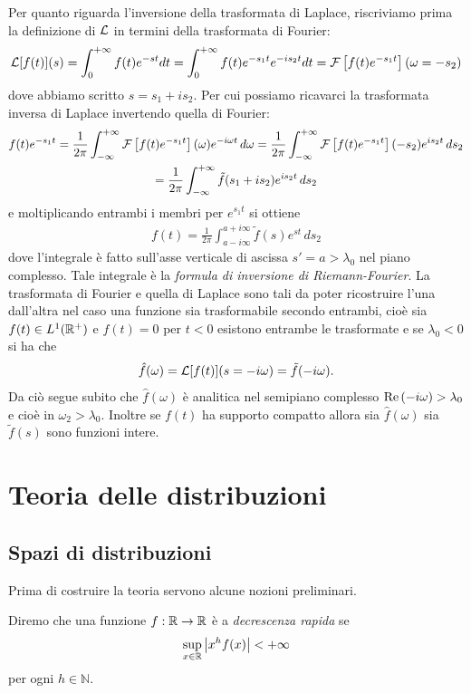 Per quanto riguarda l'inversione della trasformata di Laplace, riscriviamo prima la definizione di $ \operatorname{\mathcal{L}} $ in termini della trasformata di Fourier:
\begin{align}
  \operatorname{\mathcal{L}}[f(t)](s) = \int_0^{+\infty} f(t) e^{-st} dt = \int_0^{+\infty} f(t) e^{-s_1t} e^{-i s_2 t} dt = \operatorname{\mathcal{F}}\left[ f(t) e^{-s_1t} \right](\omega = -s_2)
\end{align}
dove abbiamo scritto $ s = s_1 + i s_2 $. Per cui possiamo ricavarci la trasformata inversa di Laplace invertendo quella di Fourier:
\begin{gather}
  f(t) e^{-s_1 t} = \frac1{2\pi} \int_{-\infty}^{+\infty} \operatorname{\mathcal{F}}\left[ f(t) e^{-s_1 t}\right] (\omega) e^{-i\omega t} \,d\omega
  = \frac1{2\pi} \int_{-\infty}^{+\infty} \operatorname{\mathcal{F}}\left[ f(t) e^{-s_1 t}\right] (-s_2) e^{is_2 t} \,ds_2
  \\
  = \frac1{2\pi} \int_{-\infty}^{+\infty} \tilde{f} (s_1 + i s_2) e^{is_2 t} \,ds_2
\end{gather}
e moltiplicando entrambi i membri per $ e^{s_1 t} $ si ottiene 
\begin{align}
  f(t) = \frac1{2\pi}\int_{a-i\infty}^{a+i\infty} \tilde{f}(s) e^{st} \,ds_2
\end{align}
dove l'integrale è fatto sull'asse verticale di ascissa $ s' = a > \lambda_0 $ nel piano complesso. Tale integrale è la 
\textit{formula di inversione di Riemann-Fourier}. La trasformata di Fourier e quella di Laplace sono tali da poter ricostruire l'una dall'altra nel caso 
una funzione sia trasformabile secondo entrambi, cioè sia $ f(t) \in L^1(\mathbb{R}^+) $ e $ f(t) = 0 $ per $ t<0 $ esistono entrambe le trasformate e se 
$ \lambda_0 < 0 $ si ha che 
\begin{align}
  \hat{f}(\omega) = \operatorname{\mathcal{L}}[f(t)](s = -i\omega) = \tilde{f}(-i\omega).
\end{align}
Da ciò segue subito che $ \hat{f}(\omega) $ è analitica nel semipiano complesso $ \textnormal{Re}\, (-i\omega) > \lambda_0 $ e cioè in 
$ \omega_2 > \lambda_0 $. Inoltre se $ f(t) $ ha supporto compatto allora sia $ \hat{f}(\omega) $ sia $ \tilde{f}(s) $ sono funzioni intere.

\chapter{Teoria delle distribuzioni}
\section{Spazi di distribuzioni}
Prima di costruire la teoria servono alcune nozioni preliminari.
\begin{definition}
  Diremo che una funzione $ f:\mathbb{R} \to \mathbb{R} $ è a \textit{decrescenza rapida} se 
  \begin{align}
    \sup_{x \in \mathbb{R}} \left|{x^h f(x) }\right| < + \infty
  \end{align}
  per ogni $ h \in \mathbb{N} $.
\end{definition}

